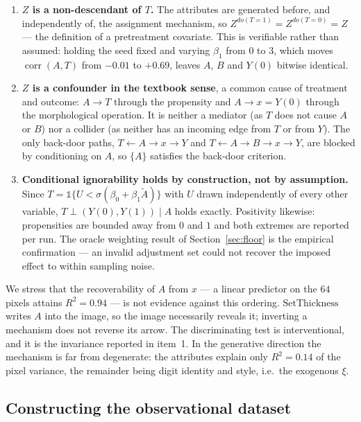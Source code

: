 \begin{enumerate}
    \item \textbf{$Z$ is a non-descendant of $T$.} The attributes are generated before, and
    independently of, the assignment mechanism, so $Z^{do(T=1)} = Z^{do(T=0)} = Z$ --- the
    definition of a pretreatment covariate. This is verifiable rather than assumed: holding the
    seed fixed and varying $\beta_1$ from $0$ to $3$, which moves
    $\operatorname{corr}(A, T)$ from $-0.01$ to $+0.69$, leaves $A$, $B$ and $Y(0)$
    bitwise identical.

    \item \textbf{$Z$ is a confounder in the textbook sense}, a common cause of treatment and
    outcome: $A \to T$ through the propensity and $A \to x = Y(0)$ through the morphological
    operation. It is neither a mediator (as $T$ does not cause $A$ or $B$) nor a collider
    (as neither has an incoming edge from $T$ or from $Y$). The only back-door paths,
    $T \leftarrow A \to x \to Y$ and $T \leftarrow A \to B \to x \to Y$, are blocked by
    conditioning on $A$, so $\{A\}$ satisfies the back-door criterion.

    \item \textbf{Conditional ignorability holds by construction, not by assumption.} Since
    $T = \mathbb{1}\{U < \sigma(\beta_0 + \beta_1 \tilde{A})\}$ with $U$ drawn independently of
    every other variable, $T \perp (Y(0), Y(1)) \mid A$ holds exactly. Positivity likewise:
    propensities are bounded away from $0$ and $1$ and both extremes are reported per run. The
    oracle weighting result of Section~\ref{sec:floor} is the empirical confirmation --- an
    invalid adjustment set could not recover the imposed effect to within sampling noise.
\end{enumerate}

We stress that the recoverability of $A$ from $x$ --- a linear predictor on the $64$ pixels
attains $R^2 = 0.94$ --- is not evidence against this ordering. $\mathrm{SetThickness}$ writes
$A$ into the image, so the image necessarily reveals it; inverting a mechanism does not reverse
its arrow. The discriminating test is interventional, and it is the invariance reported in
item~1. In the generative direction the mechanism is far from degenerate: the attributes explain
only $R^2 = 0.14$ of the pixel variance, the remainder being digit identity and style, i.e.\ the
exogenous $\xi$.

\subsection{Constructing the observational dataset}

